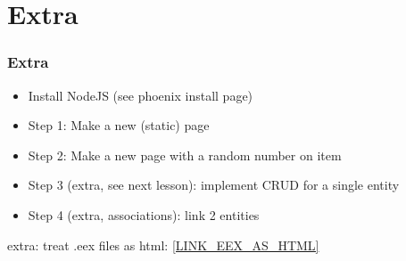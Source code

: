\section{Extra}

\frame{\tableofcontents[currentsection]}

\begin{frame}
    \frametitle{Extra}

    \begin{itemize}
        \item Install NodeJS (see phoenix install page)
        \item Step 1: Make a new (static) page
        \item Step 2: Make a new page with a random number on item
        \item Step 3 (extra, see next lesson): implement CRUD for a single entity
        \item Step 4 (extra, associations): link 2 entities 
    \end{itemize}

    extra: treat .eex files as html:
    \href{https://elixirforum.com/t/visual-studio-code-html-eex-support/12712/5?u=wfransen}{[LINK\_EEX\_AS\_HTML]}
    
    

\end{frame}
